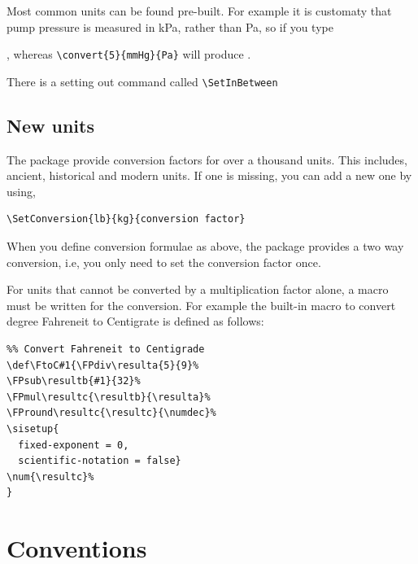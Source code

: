 \documentclass{tufte-book}
\def\SetInBetween#1{\def\between{#1}}
\gdef\SetConversion#1#2#3{%
\expandafter\gdef\csname#1#2\endcsname{#3}%
\gdef\Temp{#3}
\FPdiv\invert{1}{\Temp}
\expandafter\gdef\csname#2#1\endcsname{\invert}
}
\begin{document}


Most common units can be found pre-built. For example it is customaty that pump pressure is measured in kPa, rather than Pa, so if you type

, whereas \verb+\convert{5}{mmHg}{Pa}+ will produce .

There is a setting out command called \verb+\SetInBetween+ 

\SetInBetween{$=$}


\SetInBetween{$\rightarrow$}


\SetInBetween{equals}






\subsection{New units}

The package provide conversion factors for over a thousand units. This includes, ancient, historical and modern units. If one is missing, you can add a new one by using,

\begin{verbatim}
\SetConversion{lb}{kg}{conversion factor}
\end{verbatim}

When you define conversion formulae as above, the package provides a two way conversion, i.e, you only need to set the conversion factor once.


For units that cannot be converted by a multiplication factor alone, a macro must be written for the conversion. For example the built-in macro to convert degree Fahreneit to Centigrate is defined as follows:

\begin{verbatim}
%% Convert Fahreneit to Centigrade
\def\FtoC#1{\FPdiv\resulta{5}{9}%
\FPsub\resultb{#1}{32}%
\FPmul\resultc{\resultb}{\resulta}%
\FPround\resultc{\resultc}{\numdec}%
\sisetup{
  fixed-exponent = 0,
  scientific-notation = false}
\num{\resultc}%
}
\end{verbatim}




\section{Conventions}
\end{document}
